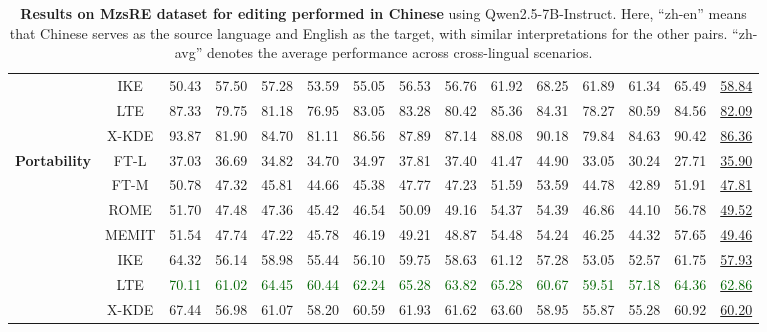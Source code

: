 \begin{table*}[!h]
{\begin{tabular}{ccccccccccccccc}
            & IKE & 50.43 & 57.50 & 57.28 & 53.59 & 55.05 & 56.53 & 56.76 & 61.92 & 68.25 & 61.89 & 61.34 & 65.49 & \underline{58.84 }\\
            & LTE & 87.33 & 79.75 & 81.18 & 76.95 & 83.05 & 83.28 & 80.42 & 85.36 & 84.31 & 78.27 & 80.59 & 84.56 & \underline{82.09} \\
           \cmidrule{2-15}
            & X-KDE & 93.87 & 81.90 & 84.70 & 81.11 & 86.56 & 87.89 & 87.14 & 88.08 & 90.18 & 79.84 & 84.63 & 90.42 & \underline{86.36} \\
           \midrule
           \multirow{7}{*}{\textbf{Portability}} 
            & FT-L & 37.03 & 36.69 & 34.82 & 34.70 & 34.97 & 37.81 & 37.40 & 41.47 & 44.90 & 33.05 & 30.24 & 27.71 & \underline{35.90} \\
            & FT-M & 50.78 & 47.32 & 45.81 & 44.66 & 45.38 & 47.77 & 47.23 & 51.59 & 53.59 & 44.78 & 42.89 &  51.91 & \underline{47.81} \\
            & ROME & 51.70 & 47.48 & 47.36 & 45.42 & 46.54 & 50.09 & 49.16 & 54.37 & 54.39 & 46.86 & 44.10 & 56.78 & \underline{49.52} \\
            & MEMIT & 51.54 & 47.74 & 47.22 & 45.78 & 46.19 & 49.21 & 48.87 & 54.48 & 54.24 & 46.25 & 44.32 & 57.65 & \underline{49.46} \\
            & IKE & 64.32 & 56.14 & 58.98 & 55.44 & 56.10 & 59.75 & 58.63 & 61.12 & 57.28 & 53.05 & 52.57 & 61.75 & \underline{57.93} \\
            & LTE & \textcolor{darkgreen}{70.11} & \textcolor{darkgreen}{61.02} & \textcolor{darkgreen}{64.45} & \textcolor{darkgreen}{60.44} &\textcolor{darkgreen}{ 62.24} & \textcolor{darkgreen}{65.28 }& \textcolor{darkgreen}{63.82} & \textcolor{darkgreen}{65.28} &\textcolor{darkgreen}{ 60.67} & \textcolor{darkgreen}{59.51} & \textcolor{darkgreen}{57.18 }& \textcolor{darkgreen}{64.36} & \underline{\textcolor{darkgreen}{62.86}} \\
           \cmidrule{2-15}
            & X-KDE & 67.44 & 56.98 & 61.07 & 58.20 & 60.59 & 61.93 & 61.62 & 63.60 & 58.95 & 55.87 & 55.28 & 60.92 & \underline{60.20}\\
           \bottomrule
        \end{tabular}
    }
    \caption{\textbf{Results on MzsRE dataset for editing performed in Chinese} using Qwen2.5-7B-Instruct. Here, ``zh-en'' means that Chinese serves as the source language and English as the target, with similar interpretations for the other pairs. ``zh-avg'' denotes the average performance across cross-lingual scenarios.}
    \label{tab:qw-zh-edit}
\end{table*}


